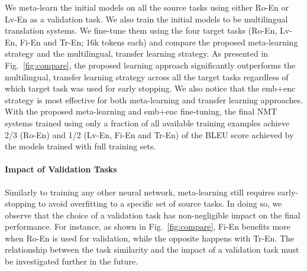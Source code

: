 We meta-learn the initial models on all the source tasks using either Ro-En or Lv-En as a validation task. We also train the initial models to be multilingual translation systems. We fine-tune them using the four target tasks (Ro-En, Lv-En, Fi-En and Tr-En; 16k tokens each) and compare the proposed meta-learning strategy and the multilingual, transfer learning strategy. As presented in Fig.~\ref{fig:compare}, the proposed learning approach significantly outperforms the multilingual, transfer learning strategy across all the target tasks regardless of which target task was used for early stopping. We also notice that the emb+enc strategy is most effective for both meta-learning and transfer learning approaches. With the proposed meta-learning and emb+enc fine-tuning, the final NMT systems trained using only a fraction of all available training examples achieve 2/3 (Ro-En) and 1/2 (Lv-En, Fi-En and Tr-En) of the BLEU score achieved by the models trained with full training sets.

\paragraph{Impact of Validation Tasks}

Similarly to training any other neural network, meta-learning still requires early-stopping to avoid overfitting to a specific set of source tasks. In doing so, we observe that the choice of a validation task has non-negligible impact on the final performance. For instance, as shown in Fig.~\ref{fig:compare}, Fi-En benefits more when Ro-En is used for validation, while the opposite happens with Tr-En. The relationship between the task similarity and the impact of a validation task must be investigated further in the future.




